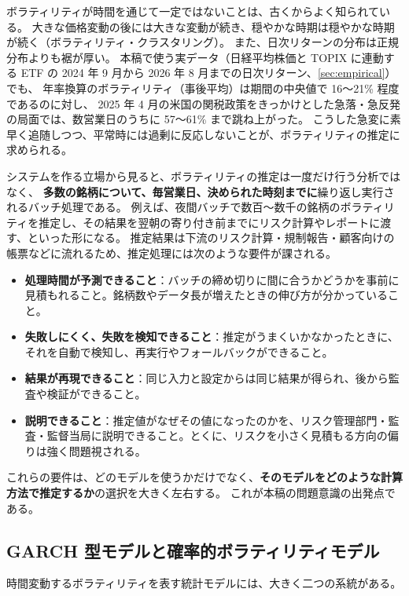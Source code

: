 ボラティリティが時間を通じて一定ではないことは、古くからよく知られている。
大きな価格変動の後には大きな変動が続き、穏やかな時期は穏やかな時期が続く（ボラティリティ・クラスタリング）。
また、日次リターンの分布は正規分布よりも裾が厚い。
本稿で使う実データ（日経平均株価と TOPIX に連動する ETF の 2024 年 9 月から 2026 年 8 月までの日次リターン、\cref{sec:empirical}）でも、
年率換算のボラティリティ（事後平均）は期間の中央値で 16〜21\% 程度であるのに対し、
2025 年 4 月の米国の関税政策をきっかけとした急落・急反発の局面では、数営業日のうちに 57〜61\% まで跳ね上がった。
こうした急変に素早く追随しつつ、平常時には過剰に反応しないことが、ボラティリティの推定に求められる。

システムを作る立場から見ると、ボラティリティの推定は一度だけ行う分析ではなく、
\textbf{多数の銘柄について、毎営業日、決められた時刻までに}繰り返し実行されるバッチ処理である。
例えば、夜間バッチで数百〜数千の銘柄のボラティリティを推定し、その結果を翌朝の寄り付き前までにリスク計算やレポートに渡す、といった形になる。
推定結果は下流のリスク計算・規制報告・顧客向けの帳票などに流れるため、推定処理には次のような要件が課される。

\begin{itemize}
  \item \textbf{処理時間が予測できること}：バッチの締め切りに間に合うかどうかを事前に見積もれること。銘柄数やデータ長が増えたときの伸び方が分かっていること。
  \item \textbf{失敗しにくく、失敗を検知できること}：推定がうまくいかなかったときに、それを自動で検知し、再実行やフォールバックができること。
  \item \textbf{結果が再現できること}：同じ入力と設定からは同じ結果が得られ、後から監査や検証ができること。
  \item \textbf{説明できること}：推定値がなぜその値になったのかを、リスク管理部門・監査・監督当局に説明できること。とくに、リスクを小さく見積もる方向の偏りは強く問題視される。
\end{itemize}

これらの要件は、どのモデルを使うかだけでなく、\textbf{そのモデルをどのような計算方法で推定するか}の選択を大きく左右する。
これが本稿の問題意識の出発点である。

\subsection{GARCH 型モデルと確率的ボラティリティモデル}\label{sec:intro-models}

時間変動するボラティリティを表す統計モデルには、大きく二つの系統がある。

